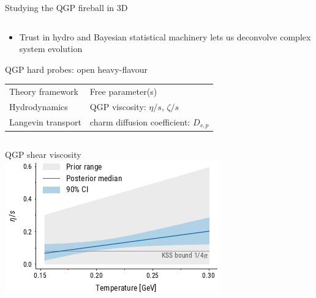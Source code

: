 \documentclass{beamer}
\begin{document}
\begin{frame}{Studying the QGP fireball in 3D}
\begin{columns}
\begin{column}{.6\textwidth}
\begin{center}
      \end{center}
    \end{column}
  \end{columns}
  \begin{itemize}
    \item Trust in hydro and Bayesian statistical machinery lets us deconvolve complex system evolution
  \end{itemize}
\end{frame}

\begin{frame}{QGP hard probes: open heavy-flavour}
  \begin{center}
    \begin{tabular}{ll}
      Theory framework & Free parameter(s)\\
      \noalign{\smallskip}\hline\noalign{\smallskip}
      \small Hydrodynamics & \small QGP viscosity: $\eta/s$, $\zeta/s$\\[.5ex]
      \small Langevin transport & \small charm diffusion coefficient: $D_{s,p}$
  \end{tabular}
  \end{center}
  \vspace{.5cm}
  \begin{columns}[T]
    \begin{column}{.55\textwidth}
      \centering \small QGP shear viscosity\\[.5ex]
      \includegraphics[width=\textwidth]{etas_estimate}
    \end{column}
    \begin{column}{.45\textwidth}

\end{column}
\end{columns}
\end{frame}
\end{document}
